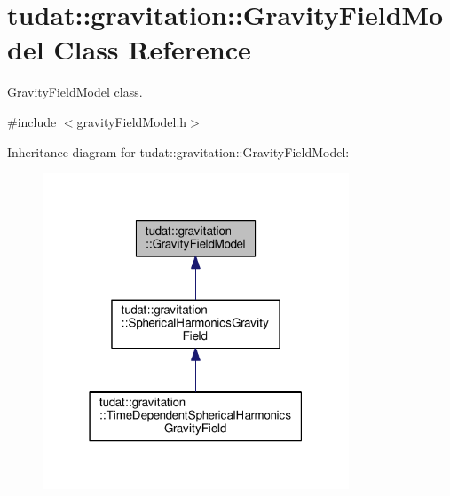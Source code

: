 \hypertarget{classtudat_1_1gravitation_1_1GravityFieldModel}{}\section{tudat\+:\+:gravitation\+:\+:Gravity\+Field\+Model Class Reference}
\label{classtudat_1_1gravitation_1_1GravityFieldModel}


\hyperlink{classtudat_1_1gravitation_1_1GravityFieldModel}{Gravity\+Field\+Model} class.  




{\ttfamily \#include $<$gravity\+Field\+Model.\+h$>$}



Inheritance diagram for tudat\+:\+:gravitation\+:\+:Gravity\+Field\+Model\+:
\nopagebreak
\begin{figure}[H]
\begin{center}
\leavevmode
\includegraphics[width=259pt]{classtudat_1_1gravitation_1_1GravityFieldModel__inherit__graph}
\end{center}
\end{figure}
